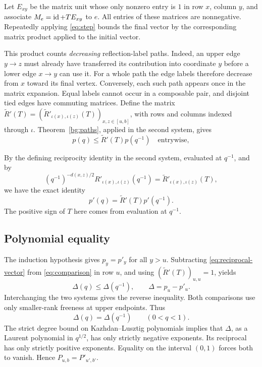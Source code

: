 Let \(E_{xy}\) be the matrix unit whose only nonzero entry is \(1\)
in row \(x\), column \(y\), and associate
\(M_e=\operatorname{id}+T E_{xy}\) to \(e\).
All entries of these matrices are nonnegative.
Repeatedly applying \eqref{eq:step} bounds the final vector by
the corresponding matrix product applied to the initial vector.

This product counts \emph{decreasing} reflection-label paths.
Indeed, an upper edge \(y\to z\) must already have transferred
its contribution into coordinate \(y\) before a lower edge
\(x\to y\) can use it.
For a whole path the edge labels therefore decrease from \(x\)
toward its final vertex.
Conversely, each such path appears once in the matrix expansion.
Equal labels cannot occur in a composable pair, and disjoint tied
edges have commuting matrices.
Define the matrix
$\widetilde R'(T)=(\widetilde R'_{\iota(x),\iota(z)}(T))_{x,z\in[u,b]}$,
with rows and columns indexed through $\iota$.
Theorem~\ref{bg:paths}, applied in the second system, gives
\begin{equation}\label{eq:comparison}
 p(q)\le \widetilde R'(T)p(q^{-1})
 \quad\text{entrywise},
\end{equation}


By the defining reciprocity identity in the second system,
evaluated at \(q^{-1}\), and by
\[
 (q^{-1})^{-d(x,z)/2}R'_{\iota(x),\iota(z)}(q^{-1})
   =\widetilde R'_{\iota(x),\iota(z)}(T),
\]
we have the exact identity
\begin{equation}\label{eq:reciprocal-vector}
 p'(q)=\widetilde R'(T)p'(q^{-1}).
\end{equation}
The positive sign of \(T\) here comes from evaluation at \(q^{-1}\).

\subsection{Polynomial equality}
The induction hypothesis gives \(p_y=p'_y\) for all \(y>u\).
Subtracting \eqref{eq:reciprocal-vector} from
\eqref{eq:comparison} in row \(u\), and using
\((\widetilde R'(T))_{u,u}=1\), yields
\[
 \Delta(q)\le\Delta(q^{-1}),\qquad \Delta=p_u-p'_u .
\]
Interchanging the two systems gives the reverse inequality.
Both comparisons use only smaller-rank freeness at upper endpoints.
Thus
\[
 \Delta(q)=\Delta(q^{-1})\qquad(0<q<1).
\]
The strict degree bound on Kazhdan--Lusztig polynomials implies that
\(\Delta\), as a Laurent polynomial in \(q^{1/2}\), has only strictly
negative exponents. Its reciprocal has only strictly positive
exponents. Equality on the interval \((0,1)\) forces both to vanish.
Hence \(P_{u,b}=P'_{u',b'}\).

